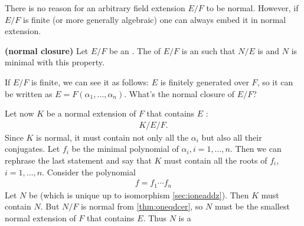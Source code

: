 \documentclass{article}
\newcommand{\bfs}[1]{\textbf{({#1}) }}
\begin{document}
There is no reason for an arbitrary field extension $E / F$ to be normal. However, if $E / F$ is finite (or more generally algebraic) one can always embed it in normal extension.
\begin{defa}\bfs{normal closure}
 Let $E / F$ be an . The of $E / F$ is an  such that $N / E$ is  and $N$ is minimal with this property.
\end{defa}

\begin{exma}
If $E / F$ is finite, we can see it as follows: $E$ is finitely generated over $F$, so it can be written as $E=F\left(\alpha_{1}, \ldots, \alpha_{n}\right)$. What's the normal closure of $E/F$?

Let now $K$ be a normal extension of $F$ that contains $E$ :
\begin{align*}
K / E / F .
\end{align*}
Since $K$ is normal, it must contain not only all the $\alpha_{i}$ but also all their conjugates. Let $f_{i}$ be the minimal polynomial of $\alpha_{i}, i=1, \ldots, n$. Then we can rephrase the last statement and say that $K$ must contain all the roots of $f_{i}$, $i=1, \ldots, n$. Consider the polynomial
\begin{align*}
f=f_{1} \cdots f_{n}
\end{align*}
Let $N$ be  (which is unique up to isomorphism \cref{sec:ioneaddz}). Then $K$ must contain $N$.   But $N / F$ is normal from \cref{thm:oneqdcer}, so $N$ must be the smallest normal extension of $F$ that contains $E$. Thus $N$ is a 
\end{exma}
\end{document}
